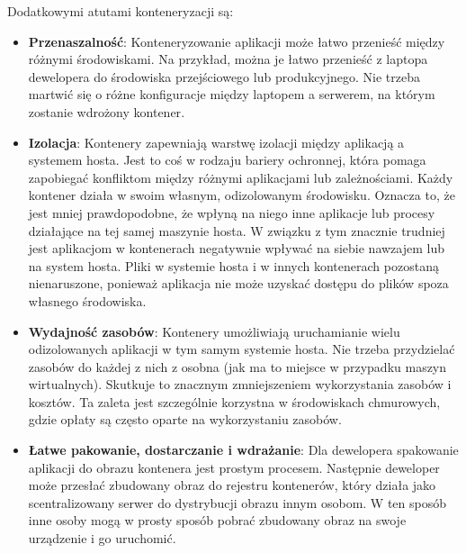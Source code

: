 Dodatkowymi atutami konteneryzacji są:

\begin{itemize}
    \item \textbf{Przenaszalność}: Konteneryzowanie aplikacji może łatwo przenieść między różnymi środowiskami. Na przykład, można je łatwo przenieść z laptopa dewelopera do środowiska przejściowego lub produkcyjnego. Nie trzeba martwić się o różne konfiguracje między laptopem a serwerem, na którym zostanie wdrożony kontener\cite{dockerContenerizationKeyAndUseCases}\cite{dockerOverview}.
    
    \item \textbf{Izolacja}: Kontenery zapewniają warstwę izolacji między aplikacją a systemem hosta. Jest to coś w rodzaju bariery ochronnej, która pomaga zapobiegać konfliktom między różnymi aplikacjami lub zależnościami. Każdy kontener działa w swoim własnym, odizolowanym środowisku. Oznacza to, że jest mniej prawdopodobne, że wpłyną na niego inne aplikacje lub procesy działające na tej samej maszynie hosta. W związku z tym znacznie trudniej jest aplikacjom w kontenerach negatywnie wpływać na siebie nawzajem lub na system hosta. Pliki w systemie hosta i w innych kontenerach pozostaną nienaruszone, ponieważ aplikacja nie może uzyskać dostępu do plików spoza własnego środowiska\cite{dockerContenerizationKeyAndUseCases}\cite{dockerOverview}.

    \item \textbf{Wydajność zasobów}: Kontenery umożliwiają uruchamianie wielu odizolowanych aplikacji w tym samym systemie hosta. Nie trzeba przydzielać zasobów do każdej z nich z osobna (jak ma to miejsce w przypadku maszyn wirtualnych). Skutkuje to znacznym zmniejszeniem wykorzystania zasobów i kosztów. Ta zaleta jest szczególnie korzystna w środowiskach chmurowych, gdzie opłaty są często oparte na wykorzystaniu zasobów\cite{dockerContenerizationKeyAndUseCases}\cite{dockerOverview}.

    \item \textbf{Łatwe pakowanie, dostarczanie i wdrażanie}: Dla dewelopera spakowanie aplikacji do obrazu kontenera jest prostym procesem. Następnie deweloper może przesłać zbudowany obraz do rejestru kontenerów, który działa jako scentralizowany serwer do dystrybucji obrazu innym osobom. W ten sposób inne osoby mogą w prosty sposób pobrać zbudowany obraz na swoje urządzenie i go uruchomić\cite{dockerContenerizationKeyAndUseCases}\cite{dockerOverview}.
\end{itemize}

